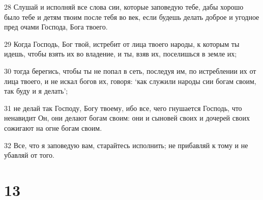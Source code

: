 \par 28 Слушай и исполняй все слова сии, которые заповедую тебе, дабы хорошо было тебе и детям твоим после тебя во век, если будешь делать доброе и угодное пред очами Господа, Бога твоего.
\par 29 Когда Господь, Бог твой, истребит от лица твоего народы, к которым ты идешь, чтобы взять их во владение, и ты, взяв их, поселишься в земле их;
\par 30 тогда берегись, чтобы ты не попал в сеть, последуя им, по истреблении их от лица твоего, и не искал богов их, говоря: `как служили народы сии богам своим, так буду и я делать';
\par 31 не делай так Господу, Богу твоему, ибо все, чего гнушается Господь, что ненавидит Он, они делают богам своим: они и сыновей своих и дочерей своих сожигают на огне богам своим.
\par 32 Все, что я заповедую вам, старайтесь исполнить; не прибавляй к тому и не убавляй от того.

\chapter{13}

